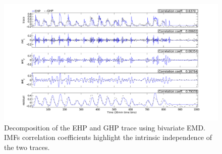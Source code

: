 \begin{figure}[tb]
\hspace{-2cm}
\includegraphics[width=1.2\textwidth]{img/emd_25_41-eps-converted-to}
\vspace{-1cm}
\caption{Decomposition of the EHP and GHP trace using bivariate EMD. IMFs correlation coefficients highlight the intrinsic independence of the two traces.}
\label{fig:emd2}
\end{figure}







